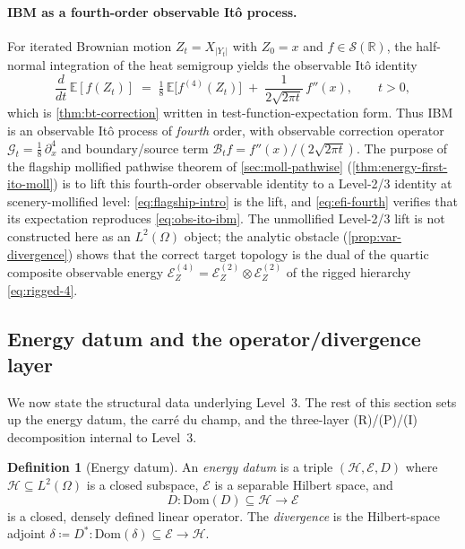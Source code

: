 \documentclass[11pt,reqno]{amsart}
\theoremstyle{plain}
\theoremstyle{definition}
\newtheorem{definition}[theorem]{Definition}
\theoremstyle{remark}
\newcommand{\R}{\mathbb{R}}
\newcommand{\E}{\mathbb{E}}
\newcommand{\Hilb}{\mathcal{H}}
\newcommand{\Dom}{\mathrm{Dom}}
\newcommand{\Energy}{\mathcal{E}}
\newcommand{\IBM}{Z}
\begin{document}
\paragraph{IBM as a fourth-order observable It\^o process.}
For iterated Brownian motion $\IBM_t=X_{|Y_t|}$ with
$\IBM_0=x$ and $f\in\mathscr S(\R)$, the half-normal integration
of the heat semigroup yields the observable It\^o identity
\begin{equation}\label{eq:obs-ito-ibm}
  \frac{d}{dt}\,\E[f(\IBM_t)]
   \;=\;\tfrac{1}{8}\,\E\bigl[f^{(4)}(\IBM_t)\bigr]
   \;+\;\frac{1}{2\sqrt{2\pi t}}\,f''(x),
  \qquad t>0,
\end{equation}
which is \cref{thm:bt-correction} written in test-function-expectation
form. Thus IBM is an observable It\^o process of \emph{fourth} order,
with observable correction operator
$\mathcal G_t=\tfrac{1}{8}\,\partial_x^{4}$ and boundary/source term
$\mathcal B_t f=f''(x)/(2\sqrt{2\pi t})$. The purpose of the
flagship mollified pathwise theorem of \cref{sec:moll-pathwise}
(\cref{thm:energy-first-ito-moll}) is to lift this fourth-order
observable identity to a Level-2/3 identity at scenery-mollified
level: \eqref{eq:flagship-intro} is the lift, and
\eqref{eq:efi-fourth} verifies that its expectation reproduces
\eqref{eq:obs-ito-ibm}. The unmollified Level-2/3 lift is not
constructed here as an $L^{2}(\Omega)$ object; the analytic
obstacle (\cref{prop:var-divergence}) shows that the correct
target topology is the dual of the quartic composite observable
energy
$\Energy_\IBM^{(4)}=\Energy_\IBM^{(2)}\otimes\Energy_\IBM^{(2)}$
of the rigged hierarchy \eqref{eq:rigged-4}.

\subsection*{Energy datum and the operator/divergence layer}

We now state the structural data underlying Level~3. The rest of
this section sets up the energy datum, the carr\'e du champ, and
the three-layer (R)/(P)/(I) decomposition internal to Level~3.

\begin{definition}[Energy datum]\label{def:energy-datum}
An \emph{energy datum} is a triple $(\Hilb,\Energy, D)$ where
$\Hilb\subseteq L^2(\Omega)$ is a closed subspace,
$\Energy$ is a separable Hilbert space, and
\[
  D\colon \Dom(D)\subseteq\Hilb \longrightarrow \Energy
\]
is a closed, densely defined linear operator. The
\emph{divergence} is the Hilbert-space adjoint
$\delta\coloneqq D^{*}\colon\Dom(\delta)\subseteq\Energy\to\Hilb$.
\end{definition}
\end{document}
